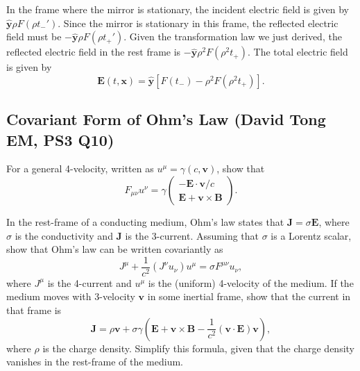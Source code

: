 In the frame where the mirror is stationary, the incident electric field is given by $\hat{\mathbf{y}}\rho F(\rho t_-')$. Since the mirror is stationary in this frame, the reflected electric field must be $-\hat{\mathbf{y}}\rho F(\rho t_+')$. Given the transformation law we just derived, the reflected electric field in the rest frame is $-\hat{\mathbf{y}}\rho^2 F(\rho^2 t_+)$. The total electric field is given by
\begin{equation}
    \mathbf{E}(t,\mathbf{x}) = \hat{\mathbf{y}}\left[F(t_-) -\rho^2 F(\rho^2 t_+) \right].
\end{equation}


\subsection{Covariant Form of Ohm's Law (David Tong EM, PS3 Q10)}
\label{sec:ohm-covariant}

For a general 4-velocity, written as $u^\mu = \gamma(c,\mathbf{v})$,
show that
\begin{equation}
  F_{\mu\nu}u^\nu = \gamma\begin{pmatrix}-\mathbf{E}\cdot\mathbf{v}/c\\[4pt]
  \mathbf{E}+\mathbf{v}\times\mathbf{B}\end{pmatrix}.
\end{equation}

In the rest-frame of a conducting medium, Ohm's law states that
$\mathbf{J}=\sigma\mathbf{E}$, where $\sigma$ is the conductivity and
$\mathbf{J}$ is the 3-current. Assuming that $\sigma$ is a Lorentz scalar,
show that Ohm's law can be written covariantly as
\begin{equation}
  J^\mu + \frac{1}{c^2}(J^\nu u_\nu)u^\mu = \sigma F^{\mu\nu}u_\nu,
\end{equation}
where $J^\mu$ is the 4-current and $u^\mu$ is the (uniform) 4-velocity of
the medium. If the medium moves with 3-velocity $\mathbf{v}$ in some inertial
frame, show that the current in that frame is
\begin{equation}
  \mathbf{J} = \rho\mathbf{v} + \sigma\gamma\!\left(\mathbf{E}
  + \mathbf{v}\times\mathbf{B} - \frac{1}{c^2}(\mathbf{v}\cdot\mathbf{E})\mathbf{v}\right),
\end{equation}
where $\rho$ is the charge density. Simplify this formula, given that the
charge density vanishes in the rest-frame of the medium.

